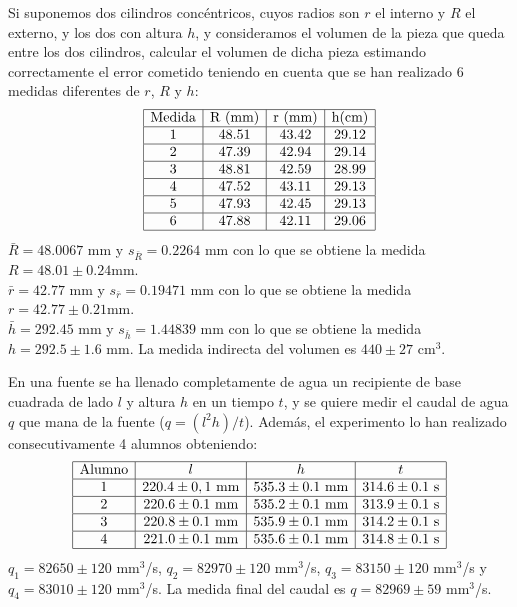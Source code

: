 {Si suponemos dos cilindros concéntricos, cuyos radios son $r$ el interno y $R$ el externo, y los dos con altura $h$, y
consideramos el volumen de la pieza que queda entre los dos cilindros, calcular el volumen de dicha pieza estimando
correctamente el error cometido teniendo en cuenta que se han realizado 6 medidas diferentes de $r$, $R$ y $h$:
\[
\begin{array}{|c|c|c|c|}
\hline
\mbox{Medida} & \mbox{R (mm)} & \mbox{r (mm)} & \mbox{h(cm)} \\
\hline
1 & 48.51 & 43.42 & 29.12 \\
\hline
2 & 47.39 & 42.94 & 29.14 \\
\hline
3 & 48.81 & 42.59 & 28.99 \\
\hline
4 & 47.52 & 43.11 & 29.13 \\
\hline
5 & 47.93 & 42.45 & 29.13 \\
\hline
6 & 47.88 & 42.11 & 29.06 \\
\hline
\end{array}
\]
}
{$\bar R=48.0067$ mm y $s_{\bar R}=0.2264$ mm con lo que se obtiene la medida $R=48.01\pm 0.24$mm.\\
$\bar r = 42.77$ mm y $s_{\bar r}=0.19471$ mm con lo que se obtiene la medida $r=42.77\pm 0.21$mm.\\
$\bar h= 292.45$ mm y $s_{\bar h}=1.44839$ mm con lo que se obtiene la medida $h=292.5\pm 1.6$ mm.
La medida indirecta del volumen es $440\pm 27$ cm$^3$. 
}
{}


{En una fuente se ha llenado completamente de agua un recipiente de base cuadrada de lado $l$ y altura $h$ en un tiempo
$t$, y se quiere medir el caudal de agua $q$ que mana de la fuente ($q=(l^2h)/t$). Además, el experimento lo han
realizado consecutivamente 4 alumnos obteniendo:
\[
\begin{array}{|c|c|c|c|}
\hline
\mbox{Alumno} & l & h & t \\
\hline
1 & 220.4 \pm 0,1 \mbox{ mm} & 535.3 \pm 0.1 \mbox{ mm} & 314.6 \pm 0.1 \mbox{ s} \\
\hline
2 & 220.6 \pm 0.1 \mbox{ mm} & 535.2 \pm 0.1 \mbox{ mm} & 313.9 \pm 0.1 \mbox{ s} \\
\hline
3 & 220.8 \pm 0.1 \mbox{ mm} & 535.9 \pm 0.1 \mbox{ mm} & 314.2 \pm 0.1 \mbox{ s} \\
\hline
4 & 221.0 \pm 0.1 \mbox{ mm} & 535.6 \pm 0.1 \mbox{ mm} & 314.8 \pm 0.1 \mbox{ s} \\
\hline
\end{array}
\]
}
{$q_1=82650\pm 120$ mm$^3$/s, $q_2=82970\pm 120$ mm$^3$/s, $q_3=83150\pm 120$ mm$^3$/s y $q_4=83010\pm 120$ mm$^3$/s.
La medida final del caudal es $q=82969\pm 59$ mm$^3$/s.
}
{}


